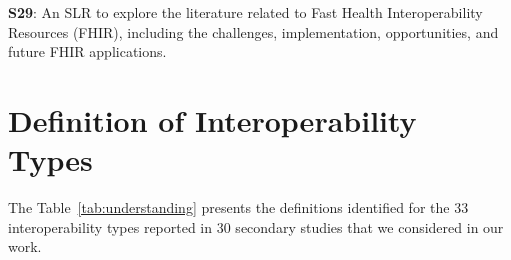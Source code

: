 \documentclass[a4paper,fleqn]{cas-dc}
\begin{document}

\noindent\textbf {S29}: An SLR to explore the literature related to Fast Health Interoperability Resources (FHIR), including the challenges, implementation, opportunities, and future FHIR applications.



\newpage
\section{Definition of Interoperability Types}

The Table~\ref{tab:understanding} presents the definitions identified for the 33 interoperability types reported in 30 secondary studies that we considered in our work.




\end{document}
